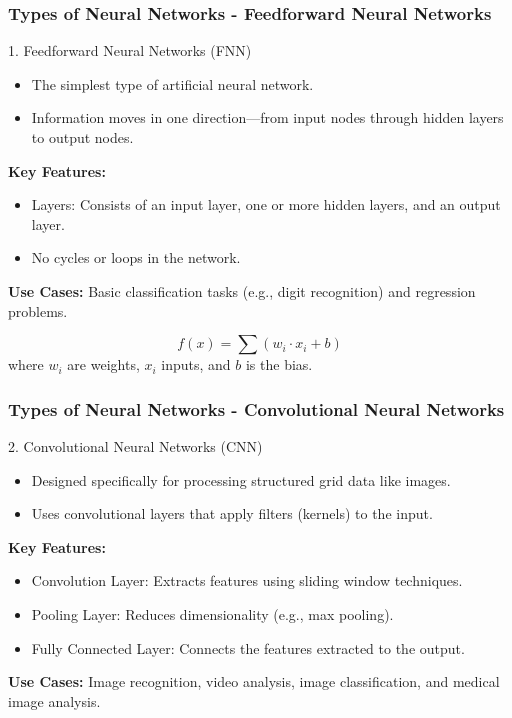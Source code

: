 \documentclass[aspectratio=169]{beamer}
\begin{document}
\begin{frame}[fragile]
    \frametitle{Types of Neural Networks - Feedforward Neural Networks}
    \begin{block}{1. Feedforward Neural Networks (FNN)}
        \begin{itemize}
            \item The simplest type of artificial neural network.
            \item Information moves in one direction—from input nodes through hidden layers to output nodes.
        \end{itemize}
        \textbf{Key Features:}
        \begin{itemize}
            \item Layers: Consists of an input layer, one or more hidden layers, and an output layer.
            \item No cycles or loops in the network.
        \end{itemize}
        \textbf{Use Cases:} Basic classification tasks (e.g., digit recognition) and regression problems.
    \end{block}
    \begin{equation}
        f(x) = \sum (w_i \cdot x_i + b)
    \end{equation}
    where \( w_i \) are weights, \( x_i \) inputs, and \( b \) is the bias.
\end{frame}

\begin{frame}[fragile]
    \frametitle{Types of Neural Networks - Convolutional Neural Networks}
    \begin{block}{2. Convolutional Neural Networks (CNN)}
        \begin{itemize}
            \item Designed specifically for processing structured grid data like images.
            \item Uses convolutional layers that apply filters (kernels) to the input.
        \end{itemize}
        \textbf{Key Features:}
        \begin{itemize}
            \item Convolution Layer: Extracts features using sliding window techniques.
            \item Pooling Layer: Reduces dimensionality (e.g., max pooling).
            \item Fully Connected Layer: Connects the features extracted to the output.
        \end{itemize}
        \textbf{Use Cases:} Image recognition, video analysis, image classification, and medical image analysis.
    \end{block}
\end{frame}
\end{document}
